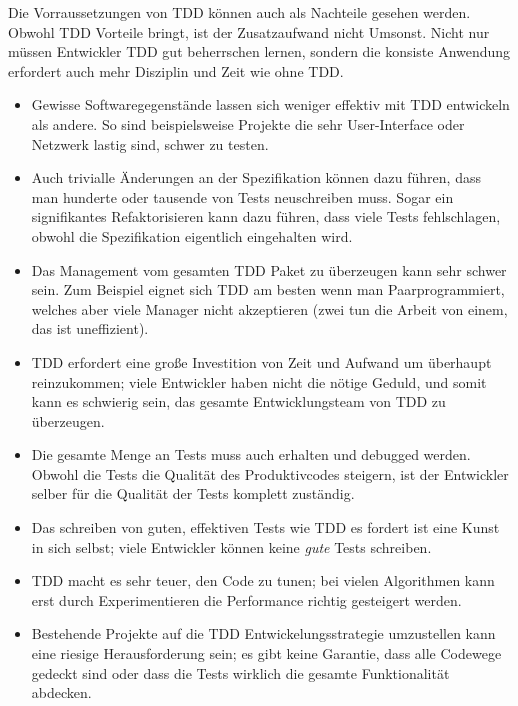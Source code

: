 \documentclass{mitschrift}
\begin{document}
Die Vorraussetzungen von TDD können auch als Nachteile gesehen werden.
Obwohl TDD Vorteile bringt, ist der Zusatzaufwand nicht Umsonst. Nicht nur
müssen Entwickler TDD gut beherrschen lernen, sondern die konsiste Anwendung
erfordert auch mehr Disziplin und Zeit wie ohne TDD.

\begin{itemize}
    \item Gewisse Softwaregegenstände lassen sich weniger effektiv mit TDD
        entwickeln als andere. So sind beispielsweise Projekte die sehr
        User-Interface oder Netzwerk lastig sind, schwer zu testen.
    \item Auch trivialle Änderungen an der Spezifikation können dazu führen,
        dass man hunderte oder tausende von Tests neuschreiben muss. Sogar
        ein signifikantes Refaktorisieren kann dazu führen, dass viele Tests
        fehlschlagen, obwohl die Spezifikation eigentlich eingehalten wird.
        \cite{StackExchange}
    \item Das Management vom gesamten TDD Paket zu überzeugen kann sehr
        schwer sein. Zum Beispiel eignet sich TDD am besten wenn man
        Paarprogrammiert, welches aber viele Manager nicht akzeptieren (zwei
        tun die Arbeit von einem, das ist uneffizient). \cite{StackOverflow}
    \item TDD erfordert eine große Investition von Zeit und Aufwand um
        überhaupt reinzukommen; viele Entwickler haben nicht die nötige Geduld,
        und somit kann es schwierig sein, das gesamte Entwicklungsteam von TDD
        zu überzeugen. \cite{StackOverflow}
    \item Die gesamte Menge an Tests muss auch erhalten und debugged werden.
        Obwohl die Tests die Qualität des Produktivcodes steigern, ist der
        Entwickler selber für die Qualität der Tests komplett zuständig.
    \item Das schreiben von guten, effektiven Tests wie TDD es fordert ist
        eine Kunst in sich selbst; viele Entwickler können keine \emph{gute}
        Tests schreiben. \cite{StackOverflow}
    \item TDD macht es sehr teuer, den Code zu tunen; bei vielen Algorithmen
        kann erst durch Experimentieren die Performance richtig gesteigert werden.
        \cite{StackOverflow}
    \item Bestehende Projekte auf die TDD Entwickelungsstrategie umzustellen
        kann eine riesige Herausforderung sein; es gibt keine Garantie, dass
        alle Codewege gedeckt sind oder dass die Tests wirklich die gesamte
        Funktionalität abdecken.
\end{itemize}
\end{document}

